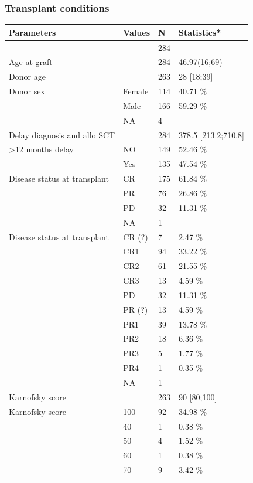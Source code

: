 \documentclass[a4paper,11pt] {article}
\begin{document}
 \subsubsection{Transplant conditions}
\begin{longtable}{llll}
  \hline
Parameters & Values & N & Statistics* \\ 
  \hline
 &  & 284 &  \\ 
  Age at graft &  & 284 & 46.97(16;69) \\ 
  Donor age &  & 263 & 28 [18;39] \\ 
  Donor sex & Female & 114 & 40.71 \% \\ 
   & Male & 166 & 59.29 \% \\ 
   & NA & 4 &  \\ 
  Delay diagnosis and allo SCT &  & 284 & 378.5 [213.2;710.8] \\ 
  >12 months delay & NO & 149 & 52.46 \% \\ 
   & Yes & 135 & 47.54 \% \\ 
  Disease status at transplant & CR & 175 & 61.84 \% \\ 
   & PR & 76 & 26.86 \% \\ 
   & PD & 32 & 11.31 \% \\ 
   & NA & 1 &  \\ 
  Disease status at transplant & CR (?) & 7 & 2.47 \% \\ 
   & CR1 & 94 & 33.22 \% \\ 
   & CR2 & 61 & 21.55 \% \\ 
   & CR3 & 13 & 4.59 \% \\ 
   & PD & 32 & 11.31 \% \\ 
   & PR (?) & 13 & 4.59 \% \\ 
   & PR1 & 39 & 13.78 \% \\ 
   & PR2 & 18 & 6.36 \% \\ 
   & PR3 & 5 & 1.77 \% \\ 
   & PR4 & 1 & 0.35 \% \\ 
   & NA & 1 &  \\ 
  Karnofsky score &  & 263 & 90 [80;100] \\ 
  Karnofsky score & 100 & 92 & 34.98 \% \\ 
   & 40 & 1 & 0.38 \% \\ 
   & 50 & 4 & 1.52 \% \\ 
   & 60 & 1 & 0.38 \% \\ 
   & 70 & 9 & 3.42 \% \\ 

\end{longtable}
\end{document}
